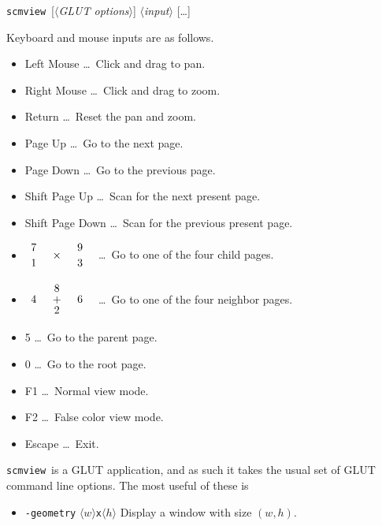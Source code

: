 \documentclass[oneside,10pt]{memoir}
\newcommand{\scmview} {\texttt{scmview}}
\newcommand{\X}[1]{\smash{#1}\phantom{o}}
\newcommand{\inangles}[1]{$\langle$#1$\rangle$}
\newenvironment{optionlist}
  {\setlength{\leftmargini}{1in}\begin{itemize}}{\end{itemize}}
\begin{document}
\begin{Spacing}{1.1}
\bigskip\noindent\scmview\ [\inangles{\textit{GLUT options}}] \inangles{\textit{input}} [\ldots]

\bigskip Keyboard and mouse inputs are as follows.

\begin{optionlist}
\item[Left Mouse] \ldots\ Click and drag to pan.
\item[Right Mouse] \ldots\ Click and drag to zoom.
\item[Return] \ldots\ Reset the pan and zoom.
\item[Page Up] \ldots\ Go to the next page.
\item[Page Down] \ldots\ Go to the previous page.
\item[Shift Page Up] \ldots\ Scan for the next present page.
\item[Shift Page Down] \ldots\ Scan for the previous present page.
\item[{\setlength{\arraycolsep}{0pt}
$\begin{array}{ccc}
\X{7} & \X{ }      & \X{9} \\[-5pt]
\X{ } & \X{\times} & \X{ } \\[-5pt]
\X{1} & \X{ }      & \X{3} \\
\end{array}$
}] \ldots\ Go to one of the four child pages.
\item[{\setlength{\arraycolsep}{0pt}
$\begin{array}{ccc}
\X{ } & \X{8} & \X{ } \\[-2pt]
\X{4} & \X{+} & \X{6} \\[-2pt]
\X{ } & \X{2} & \X{ } \\
\end{array}$
}] \ldots\ Go to one of the four neighbor pages.
\item[5] \dots\ Go to the parent page.
\item[0] \dots\ Go to the root page.
\item[F1] \ldots\ Normal view mode.
\item[F2] \ldots\ False color view mode.
\item[Escape] \ldots\ Exit.
\end{optionlist}

\scmview\ is a \textsc{GLUT} application, and as such it takes the usual set of \textsc{GLUT} command line options. The most useful of these is

\begin{optionlist}
\item[\texttt{-geometry} \inangles{$w$}\texttt{x}\inangles{$h$}] Display a window with size $(w, h)$.
\end{optionlist}


\end{Spacing}
\end{document}
